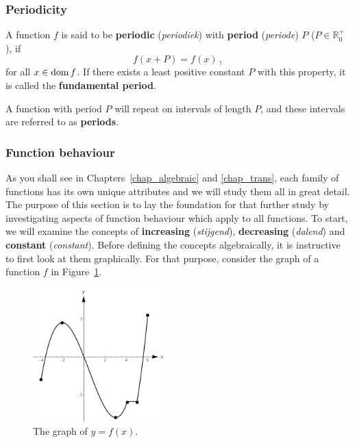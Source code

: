\subsubsection{Periodicity}
\begin{definition}\label{periodicfunction}
A function $f$ is said to be \textbf{periodic} (\textit{periodiek}) with \textbf{period} (\textit{periode}) $P$ ($P\in\mathbb{R}^+_0$), if 
$$
f(x+P)=f(x)\,,
$$
for all $x\in\text{dom}{\,}f$. If there exists a least positive constant $P$ with this property, it is called the \textbf{fundamental period}. 
\end{definition}
A function with period $P$ will repeat on intervals of length $P$, and these intervals are referred to as \textbf{periods}.


\subsubsection{Function behaviour}
As you shall see in Chapters~\ref{chap_algebraic} and \ref{chap_trans}, each family of functions has its own unique attributes and we will study them all in great detail.  The purpose of this section is to lay the foundation for that further study by investigating aspects of function behaviour which apply to all functions.  To start, we will examine the concepts of {\bf increasing} (\textit{stijgend}), {\bf decreasing} (\textit{dalend}) and {\bf constant} (\textit{constant}).  Before defining the concepts algebraically, it is instructive to first look at them graphically. For that purpose, consider the graph of a function $f$ in Figure~\ref{fig_functions_19}. 
\begin{figure}[h]
	\begin{center}
			\includegraphics[width=0.45\textwidth]{fig_functions_19}
	\caption{The graph of $y=f(x)$.}
	\label{fig_functions_19}
	\end{center}
\end{figure}



